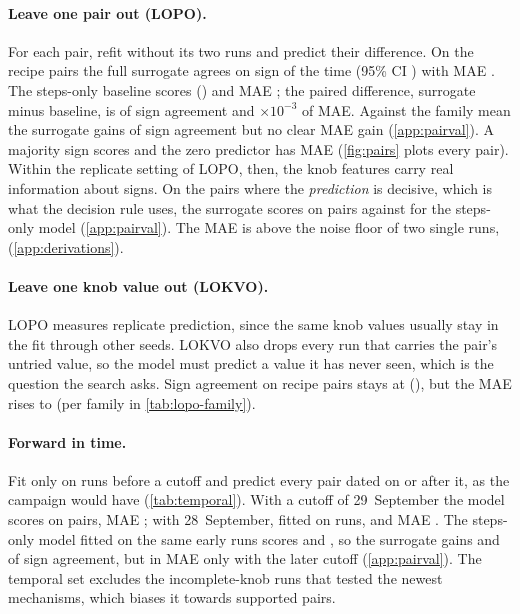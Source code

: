 \paragraph{Leave one pair out (LOPO).} For each pair, refit without its two runs and predict their difference. On
the  recipe pairs the full surrogate agrees on sign  of the time (95\% CI
) with MAE . The steps-only baseline scores 
() and MAE ; the paired difference, surrogate minus baseline, is
 of sign agreement and $\times10^{-3}$ of MAE. Against the family
mean the surrogate gains  of sign agreement but no clear MAE gain (\cref{app:pairval}). A majority
sign scores  and the zero predictor has MAE
 (\cref{fig:pairs} plots every pair). Within the replicate setting of LOPO, then, the knob
features carry real information about signs. On the pairs where the \emph{prediction} is decisive, which is what
the decision rule uses, the surrogate scores  on  pairs against
 for the steps-only model (\cref{app:pairval}). The MAE is above the noise floor of two
single runs,  (\cref{app:derivations}).

\paragraph{Leave one knob value out (LOKVO).} LOPO measures replicate prediction, since the same knob values usually
stay in the fit through other seeds. LOKVO also drops every run that carries the pair's untried value, so the model
must predict a value it has never seen, which is the question the search asks. Sign agreement on recipe pairs stays
at  (), but the MAE rises to  (per family in \cref{tab:lopo-family}).

\paragraph{Forward in time.} Fit only on runs before a cutoff and predict every pair dated on or after it, as the
campaign would have (\cref{tab:temporal}). With a cutoff of 29~September the model scores  on
 pairs, MAE ; with 28~September, fitted on  runs, 
and MAE . The steps-only model fitted on the same early runs scores  and
, so the surrogate gains  and  of sign
agreement, but in MAE only with the later cutoff (\cref{app:pairval}). The temporal set excludes the incomplete-knob
runs that tested the newest mechanisms, which biases it towards supported pairs.

